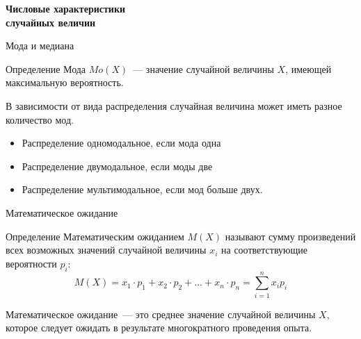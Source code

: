 \documentclass[unicode,11pt,notheorems,xcolor=table]{beamer}
\begin{document}
\begin{frame}{}{}
    {\centering \bfseries \Large Числовые характеристики \\случайных величин\par}
\end{frame}
\begin{frame}[t]{Мода и медиана}{}
    \begin{block}{Определение}
        \alert{Мода $Mo(X)$}~--- значение случайной величины $X$, имеющей максимальную вероятность.
    \end{block}
    
    В зависимости от вида распределения случайная величина может иметь разное количество мод. 
    
    \begin{itemize}
        \item Распределение \alert{одномодальное}, если мода одна
        \item Распределение \alert{двумодальное}, если моды две
        \item Распределение \alert{мультимодальное}, если   мод больше двух.
    \end{itemize}


\end{frame}

\begin{frame}{Математическое ожидание}{}
    \begin{block}{Определение}
    \alert{Математическим ожиданием} $M(X)$ называют сумму произведений всех возможных значений случайной величины $x_i$ на соответствующие вероятности $p_i$:               
    $$
        M(X) = x_1\cdot p_1 + x_2 \cdot p_2 + \ldots + x_n \cdot p_n = \sum_{i=1}^n x_i p_i
    $$
    \end{block}

    Математическое ожидание~--- это среднее значение случайной величины $X$, которое следует ожидать в результате многократного проведения опыта.
\end{frame}
\end{document}
